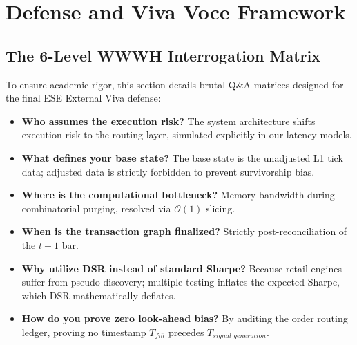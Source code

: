 \chapter{Defense and Viva Voce Framework}
\section{The 6-Level WWWH Interrogation Matrix}
To ensure academic rigor, this section details brutal Q\&A matrices designed for the final ESE External Viva defense:
\begin{itemize}
    \item \textbf{Who assumes the execution risk?} The system architecture shifts execution risk to the routing layer, simulated explicitly in our latency models.
    \item \textbf{What defines your base state?} The base state is the unadjusted L1 tick data; adjusted data is strictly forbidden to prevent survivorship bias.
    \item \textbf{Where is the computational bottleneck?} Memory bandwidth during combinatorial purging, resolved via $\mathcal{O}(1)$ slicing.
    \item \textbf{When is the transaction graph finalized?} Strictly post-reconciliation of the $t+1$ bar.
    \item \textbf{Why utilize DSR instead of standard Sharpe?} Because retail engines suffer from pseudo-discovery; multiple testing inflates the expected Sharpe, which DSR mathematically deflates.
    \item \textbf{How do you prove zero look-ahead bias?} By auditing the order routing ledger, proving no timestamp $T_{fill}$ precedes $T_{signal\_generation}$.
\end{itemize}
